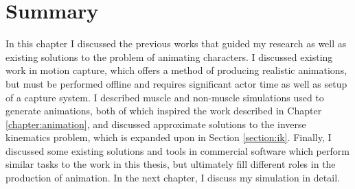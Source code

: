 \section{Summary}
\label{section:background_summary}
In this chapter I discussed the previous works that guided my research as well as existing solutions to the problem of animating characters. I discussed existing work in motion capture, which offers a method of producing realistic animations, but must be performed offline and requires significant actor time as well as setup of a capture system.  I described muscle and non-muscle simulations used to generate animations, both of which inspired the work described in Chapter \ref{chapter:animation}, and discussed approximate solutions to the inverse kinematics problem, which is expanded upon in Section \ref{section:ik}.  Finally, I discussed some existing solutions and tools in commercial software which perform similar tasks to the work in this thesis, but ultimately fill different roles in the production of animation.  In the next chapter, I discuss my simulation in detail.